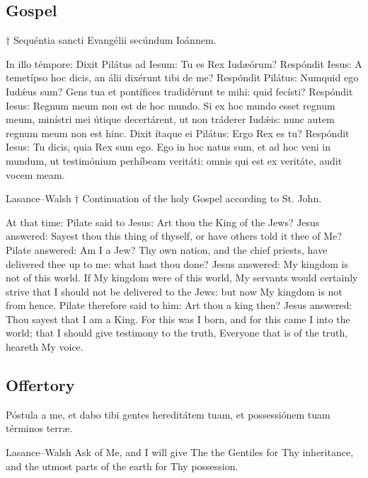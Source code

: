 \subsection{Gospel}
\label{proper-gospel}
\begin{latinproper}
† Sequéntia sancti Evangélii secúndum Ioánnem.

In illo témpore: Dixit Pilátus ad Iesum: Tu es Rex Iudæórum? Respóndit Iesus: A temetípso hoc dicis, an álii dixérunt tibi de me? Respóndit Pilátus: Numquid ego Iudǽus sum? Gens tua et pontífices tradidérunt te mihi: quid fecísti? Respóndit Iesus: Regnum meum non est de hoc mundo. Si ex hoc mundo esset regnum meum, minístri mei útique decertárent, ut non tráderer Iudǽis: nunc autem regnum meum non est hinc. Dixit ítaque ei Pilátus: Ergo Rex es tu? Respóndit Iesus: Tu dicis, quia Rex sum ego. Ego in hoc natus sum, et ad hoc veni in mundum, ut testimónium perhíbeam veritáti: omnis qui est ex veritáte, audit vocem meam.
\end{latinproper}
\begin{englishwitness}{Lasance--Walsh}
† Continuation of the holy Gospel according to St. John.

At that time: Pilate said to Jesus: Art thou the King of the Jews? Jesus answered: Sayest thou this thing of thyself, or have others told it thee of Me? Pilate answered: Am I a Jew? Thy own nation, and the chief priests, have delivered thee up to me: what hast thou done? Jesus answered: My kingdom is not of this world. If My kingdom were of this world, My servants would certainly strive that I should not be delivered to the Jews: but now My kingdom is not from hence. Pilate therefore said to him: Art thou a king then? Jesus answered: Thou sayest that I am a King. For this was I born, and for this came I into the world; that I should give testimony to the truth, Everyone that is of the truth, heareth My voice.
\end{englishwitness}
\subsection{Offertory}
\label{proper-offertory}
\begin{latinproper}
Póstula a me, et dabo tibi gentes hereditátem tuam, et possessiónem tuam términos terræ.
\end{latinproper}
\begin{englishwitness}{Lasance--Walsh}
Ask of Me, and I will give The the Gentiles for Thy inheritance, and the utmost parts of the earth for Thy possession.
\end{englishwitness}
